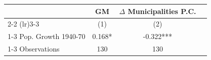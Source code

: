 \begin{tabular}{l*{3}{c}} \toprule
& GM & $\Delta$ Municipalities P.C. \\
\cmidrule(lr){2-2} \cmidrule(lr){3-3}
&\multicolumn{1}{c}{(1)} & \multicolumn{1}{c}{(2)} \\
\cmidrule(lr){1-3}
 Pop. Growth 1940-70 & 0.168* & -0.322*** \\
\cmidrule(lr){1-3}
Observations & 130 & 130 \\
\bottomrule
\end{tabular}
